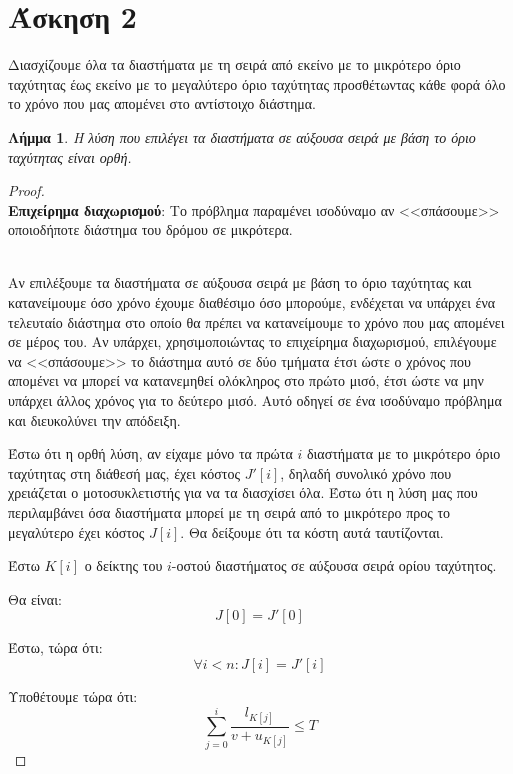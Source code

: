 \documentclass[11pt,a4paper]{book}
\newtheorem*{lemma}{Λήμμα}
\begin{document}
\section*{Άσκηση 2}
Διασχίζουμε όλα τα διαστήματα με τη σειρά από εκείνο με το μικρότερο όριο ταχύτητας έως εκείνο με το μεγαλύτερο όριο ταχύτητας προσθέτωντας κάθε φορά όλο το χρόνο που μας απομένει στο αντίστοιχο διάστημα.

\begin{lemma}
Η λύση που επιλέγει τα διαστήματα σε αύξουσα σειρά με βάση το όριο ταχύτητας είναι ορθή.
\end{lemma}
\begin{proof}

\hspace*{\fill} \\

{\bf Επιχείρημα διαχωρισμού}: Το πρόβλημα παραμένει ισοδύναμο αν <<σπάσουμε>> οποιοδήποτε διάστημα του δρόμου σε μικρότερα.

\hspace*{\fill} \\

Αν επιλέξουμε τα διαστήματα σε αύξουσα σειρά με βάση το όριο ταχύτητας και κατανείμουμε όσο χρόνο έχουμε διαθέσιμο όσο μπορούμε, ενδέχεται να υπάρχει ένα τελευταίο διάστημα στο οποίο θα πρέπει να κατανείμουμε το χρόνο που μας απομένει σε μέρος του. Αν υπάρχει, χρησιμοποιώντας το επιχείρημα διαχωρισμού, επιλέγουμε να <<σπάσουμε>> το διάστημα αυτό σε δύο τμήματα έτσι ώστε ο χρόνος που απομένει να μπορεί να κατανεμηθεί ολόκληρος στο πρώτο μισό, έτσι ώστε να μην υπάρχει άλλος χρόνος για το δεύτερο μισό. Αυτό οδηγεί σε ένα ισοδύναμο πρόβλημα και διευκολύνει την απόδειξη.

Έστω ότι η ορθή λύση, αν είχαμε μόνο τα πρώτα $i$ διαστήματα με το μικρότερο όριο ταχύτητας στη διάθεσή μας, έχει κόστος $J'[ i ]$, δηλαδή συνολικό χρόνο που χρειάζεται ο μοτοσυκλετιστής για να τα διασχίσει όλα. Έστω ότι η λύση μας που περιλαμβάνει όσα διαστήματα μπορεί με τη σειρά από το μικρότερο προς το μεγαλύτερο έχει κόστος $J[ i ]$. Θα δείξουμε ότι τα κόστη αυτά ταυτίζονται.

Έστω $K[ i ]$ ο δείκτης του $i$-οστού διαστήματος σε αύξουσα σειρά ορίου ταχύτητος.

Θα είναι:
\[
J[ 0 ] = J'[ 0 ]
\]

Έστω, τώρα ότι:
\[
\forall i < n: J[ i ] = J'[ i ]
\]

Υποθέτουμε τώρα ότι:
\[
\sum_{j=0}^i \frac{l_{K[ j ]}}{v + u_{K[ j ]}} \leq T
\]


\end{proof}
\end{document}
